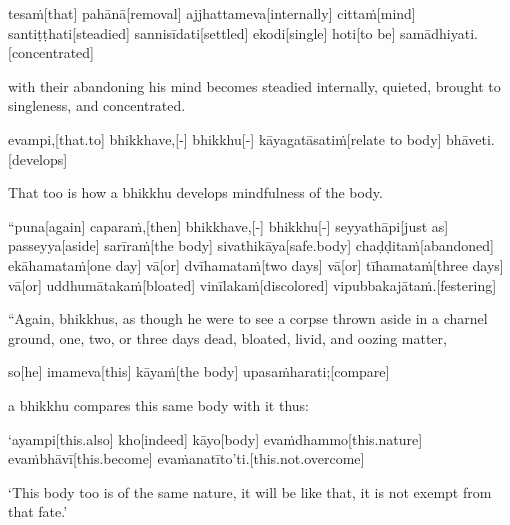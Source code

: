 \begin{samepage}
\begingl[glneveryline={\PaliGlossA,\PaliGlossB}]
tesaṁ[that] pahānā[removal] ajjhattameva[internally] cittaṁ[mind] santiṭṭhati[steadied] sannisīdati[settled] ekodi[single] hoti[to be] samādhiyati.[concentrated]
\endgl
\nopagebreak
\linespread{0.5}
\begin{spacin}{0.2}
{\PaliGlossFT with their abandoning his mind becomes steadied internally, quieted, brought to singleness, and concentrated.}
\end{spacin}
\vskip 12pt
\end{samepage}
\begin{samepage}
\begingl[glneveryline={\PaliGlossA,\PaliGlossB}]
evampi,[that.to] bhikkhave,[-] bhikkhu[-] kāyagatāsatiṁ[relate to body] bhāveti.[develops]
\endgl
\nopagebreak
\linespread{0.5}
\begin{spacin}{0.2}
{\PaliGlossFT That too is how a bhikkhu develops mindfulness of the body.}
\end{spacin}
\vskip 12pt
\end{samepage}
\vskip 0.2in
\begin{samepage}
\begingl[glneveryline={\PaliGlossA,\PaliGlossB}]
“puna[again] caparaṁ,[then] bhikkhave,[-] bhikkhu[-] seyyathāpi[just as] passeyya[aside] sarīraṁ[the body] sivathikāya[safe.body] chaḍḍitaṁ[abandoned] ekāhamataṁ[one day] vā[or] dvīhamataṁ[two days] vā[or] tīhamataṁ[three days] vā[or] uddhumātakaṁ[bloated] vinīlakaṁ[discolored] vipubbakajātaṁ.[festering]
\endgl
\nopagebreak
\linespread{0.5}
\begin{spacin}{0.2}
{\PaliGlossFT “Again, bhikkhus, as though he were to see a corpse thrown aside in a charnel ground, one, two, or three days dead, bloated, livid, and oozing matter,}
\end{spacin}
\vskip 12pt
\end{samepage}
\begin{samepage}
\begingl[glneveryline={\PaliGlossA,\PaliGlossB}]
so[he] imameva[this] kāyaṁ[the body] upasaṁharati;[compare]
\endgl
\nopagebreak
\linespread{0.5}
\begin{spacin}{0.2}
{\PaliGlossFT a bhikkhu compares this same body with it thus:}
\end{spacin}
\vskip 12pt
\end{samepage}
\begin{samepage}
\begingl[glneveryline={\PaliGlossA,\PaliGlossB}]
‘ayampi[this.also] kho[indeed] kāyo[body] evaṁdhammo[this.nature] evaṁbhāvī[this.become] evaṁanatīto’ti.[this.not.overcome]
\endgl
\nopagebreak
\linespread{0.5}
\begin{spacin}{0.2}
{\PaliGlossFT ‘This body too is of the same nature, it will be like that, it is not exempt from that fate.’}
\end{spacin}
\vskip 12pt
\end{samepage}
